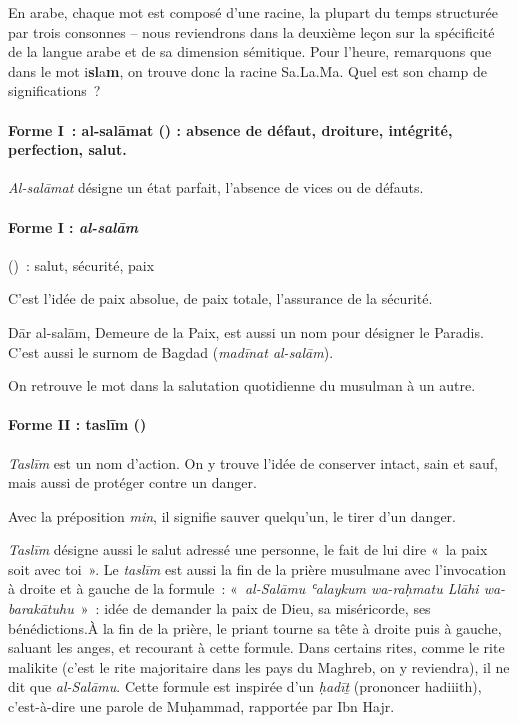 En arabe, chaque mot est composé d'une racine, la plupart du temps
structurée par trois consonnes -- nous reviendrons dans la deuxième
leçon sur la spécificité de la langue arabe et de sa dimension
sémitique. Pour l'heure, remarquons que dans le mot
i\textbf{sl}a\textbf{m}, on trouve donc la racine Sa.La.Ma. Quel est son
champ de significations~?

 
\paragraph{Forme I~: al-salāmat () :
absence de défaut, droiture, intégrité, perfection, salut.
}

\emph{Al-salāmat} désigne un état parfait, l'absence de vices ou de
défauts.

\paragraph{ Forme I : \emph{al-salām}} (\textbf{})~: salut, sécurité,
paix

C'est l'idée de paix absolue, de paix totale, l'assurance de la
sécurité.

Dār al-salām, Demeure de la Paix, est aussi un nom pour désigner le
Paradis. C'est aussi le surnom de Bagdad (\emph{madīnat al-salām}).

On retrouve le mot dans la salutation quotidienne du musulman à un
autre.


\paragraph{ Forme II : taslīm
()~}

\emph{Taslīm} est un nom d'action. On y trouve l'idée de conserver
intact, sain et sauf, mais aussi de protéger contre un danger.

Avec la préposition \emph{min}, il signifie sauver quelqu'un, le tirer
d'un danger.

\emph{Taslīm} désigne aussi le salut adressé une personne, le fait de
lui dire «~la paix soit avec toi~». Le \emph{taslīm} est aussi la fin de
la prière musulmane avec l'invocation à droite et à gauche de la
formule~: «~\emph{al-Salāmu ʿalaykum wa-raḥmatu Llāhi wa-barakātuhu~}»~:
idée de demander la paix de Dieu, sa miséricorde, ses
bénédictions.À la fin de la prière, le priant tourne sa tête à
  droite puis à gauche, saluant les anges, et recourant à cette formule.
  Dans certains rites, comme le rite malikite (c'est le rite majoritaire
  dans les pays du Maghreb, on y reviendra), il ne dit que
  \emph{al-Salāmu}. Cette formule est inspirée d'un \emph{ḥadīṯ}
  (prononcer hadiiith), c'est-à-dire une parole de Muḥammad, rapportée
  par Ibn Hajr.

